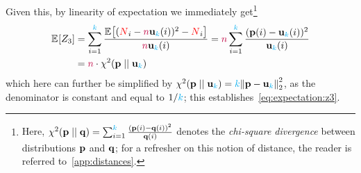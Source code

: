 Given this, by linearity of expectation we immediately get\footnote{Here, $\chisquare{\p}{\q} = \sum_{i=1}^\ab\frac{(\p(i)-\q(i))^2}{\q(i)}$ denotes the \emph{chi-square divergence} between distributions $\mathbf{p}$ and $\mathbf{q}$; for a refresher on this notion of distance, the reader is referred to~\cref{app:distances}.}
\begin{align}
    \bEE{Z_3} 
    &= \sum_{i=1}^\ab \frac{\bEE{(\occur_i-\ns\uniform_\ab(i))^2- \occur_i}}{\ns\uniform_\ab(i)}
    = \ns\sum_{i=1}^\ab \frac{(\p(i)-\uniform_\ab(i))^2}{\uniform_\ab(i)} \notag\\
    &= \ns\cdot\chisquare{\p}{\uniform_\ab} \label{eq:expectation:z3:chisquare}
\end{align}
which here can further be simplified by $\chisquare{\p}{\uniform_\ab} = \ab\normtwo{\p-\uniform_\ab}^2$, as the denominator is constant and equal to $1/{\textcolor{cyan}{k}}$; this establishes~\cref{eq:expectation:z3}.

